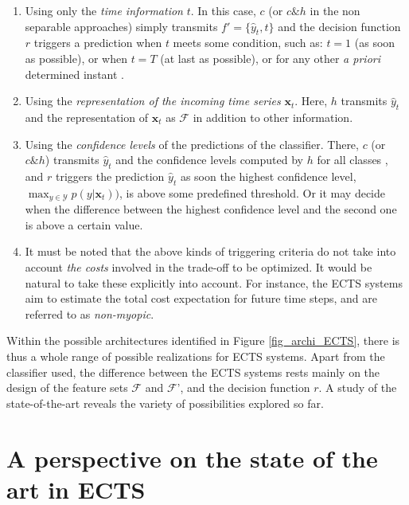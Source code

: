 \documentclass[sigconf, nonacm, table]{acmart}
\begin{document}
\begin{enumerate}
   \item Using only the \textit{time information} $t$. In this case, $c$ (or $c \& h$ in the non separable approaches) simply transmits $f' = \{\hat{y}_t, t\}$ and the decision function $r$ triggers a prediction when $t$ meets some condition, such as: $t=1$ (as soon as possible), or when $t=T$ (at last as possible), or for any other \textit{a priori} determined instant \cite{xing2009early}.
   
   \item Using the \textit{representation of the incoming time series} $\mathbf{x}_t$. Here, $h$ transmits $\hat{y}_t$ and the representation of $\mathbf{x}_t$ as $\mathcal{F}$ in addition to other information. 
   
   \item Using the \textit{confidence levels} of the predictions of the classifier. There, $c$ (or $c \& h$) transmits $\hat{y}_t$ and the confidence levels computed by $h$ for all classes \cite{mori2017early, lv2019effective, schafer2020teaser, bilski2023calimera}, and $r$ triggers the prediction $\hat{y}_t$ as soon the highest confidence level, $\max_{y \in \mathcal{Y}} p(y|\mathbf{x}_t))$, is above some predefined threshold. Or it may decide when the difference between the highest confidence level and the second one is above a certain value. 
   
   \item It must be noted that the above kinds of triggering criteria do not take into account \textit{the costs} involved in the trade-off to be optimized. It would be natural to take these explicitly into account. For instance, the ECTS systems \cite{dachraoui2015early, tavenard2016cost, achenchabe2021early, zafar2021early, bilski2023calimera} aim to estimate the total cost expectation for future time steps, and are referred to as \textit{non-myopic}.  
  
\end{enumerate}

Within the possible architectures identified in Figure \ref{fig_archi_ECTS}, there is thus a whole range of possible realizations for ECTS systems. Apart from the classifier used, the difference between the ECTS systems rests mainly on the design of the feature sets $\mathcal{F}$ and $\mathcal{F}$',  
and the decision function $r$. A study of the state-of-the-art reveals the variety of possibilities explored so far. 

\section{A perspective on the state of the art in ECTS}
\label{sec:related_work}
 
\end{document}
